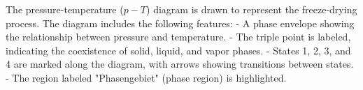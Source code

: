 The pressure-temperature (\(p-T\)) diagram is drawn to represent the freeze-drying process. The diagram includes the following features:  
- A phase envelope showing the relationship between pressure and temperature.  
- The triple point is labeled, indicating the coexistence of solid, liquid, and vapor phases.  
- States 1, 2, 3, and 4 are marked along the diagram, with arrows showing transitions between states.  
- The region labeled "Phasengebiet" (phase region) is highlighted.